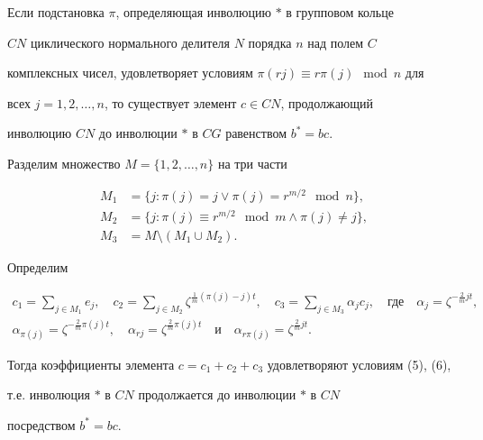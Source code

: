 \begin{lem}


Если подстановка $\pi$, определяющая инволюцию $*$ в групповом кольце


$CN$ циклического нормального делителя $N$ порядка $n$ над полем $C$


комплексных чисел, удовлетворяет условиям $\pi(rj)\equiv r\pi(j)\mod{n}$ для


всех $j=1,2,\dotsc,n$, то существует элемент $c\in CN$, продолжающий


инволюцию $CN$ до инволюции $*$ в $CG$ равенством $b^*=bc$.


\end{lem}





\begin{pf}


Разделим множество $M=\{1,2,\dotsc,n\}$ на три части


\begin{align*}


M_1&=\{j:\pi(j)=j\vee\pi(j)=r^{m/2}\mod{n}\},\\


M_2&=\{j:\pi(j)\equiv r^{m/2}\mod{m}\wedge\pi(j)\ne j\},\\


M_3&=M\setminus(M_1\cup M_2).


\end{align*}


Определим


\begin{gather*}


c_1=\sum_{j\in M_1}e_j,\quad


c_2=\sum_{j\in M_2}\zeta^{\frac{1}{m}(\pi(j)-j)t},\quad


c_3=\sum_{j\in M_3}\alpha_jc_j,\quad \text{где}\quad


\alpha_j=\zeta^{-\frac{2}{m}jt}, \\


%


\alpha_{\pi(j)}=\zeta^{-\frac{2}{m}\pi(j)t},\quad


\alpha_{rj}=\zeta^{\frac{2}{m}\pi(j)t}\quad\text{и}\quad


\alpha_{r\pi(j)}=\zeta^{\frac{2}{m}jt}.


\end{gather*}


Тогда коэффициенты элемента $c=c_1+c_2+c_3$ удовлетворяют условиям (5), (6),


т.е. инволюция $*$ в $CN$ продолжается до инволюции $*$ в $CN$


посредством $b^*=bc$.


\end{pf}





